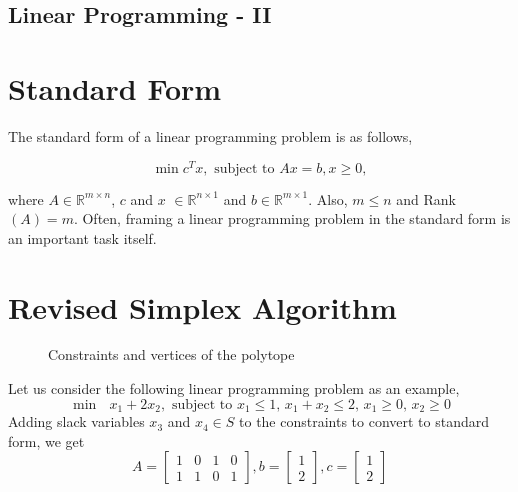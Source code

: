 \documentclass[12pt,letterpaper]{article}
\newcommand{\R}{\mathbb{R}}
\begin{document}
	
\begin{center}
	\section*{Linear Programming - II}
\end{center} 

\section{Standard Form}

The standard form of a linear programming problem is as follows,

\begin{equation*}
\min c^{T}x, \text{ subject to } Ax = b, x \geq 0,
\end{equation*}

where $A \in \R^{m \times n}$, $c$ and $x$ $\in \R^{n\times1}$ and $b \in \R^{m\times1}$. Also, $m \leq n$ and Rank$(A) = m$. Often, framing a linear programming problem in the standard form is an important task itself.

\section{Revised Simplex Algorithm}

\begin{figure}[h]
	\centering
	\caption{Constraints and vertices of the polytope}
	\label{fig1}
\end{figure}

Let us consider the following linear programming problem as an example, 
\begin{equation*}
\min \text{ } x_1+2x_2, \text{ subject to } x_1 \leq 1 \text{, } x_1 + x_2 \leq 2\text{, } x_1 \geq 0\text{, } x_2 \geq 0
\end{equation*}
Adding slack variables $x_3$ and $x_4 \in S$ to the constraints to convert to standard form, we get
\[
A =  \begin{bmatrix}
1 & 0 & 1 & 0 \\
1 & 1 & 0 & 1
\end{bmatrix}
, b = \begin{bmatrix}
1 \\
2
\end{bmatrix}
, c = \begin{bmatrix}
1 \\
2
\end{bmatrix}
\]
\end{document}
